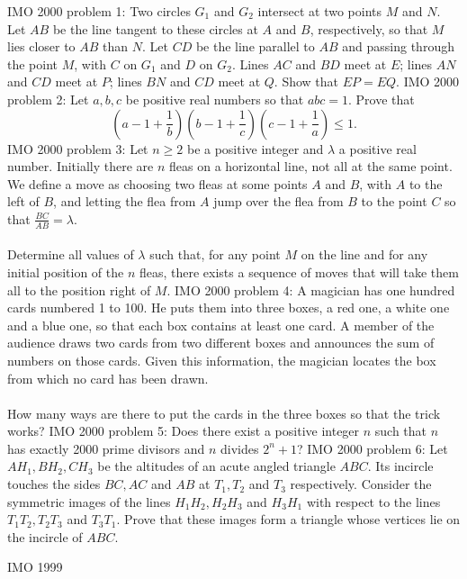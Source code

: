 IMO 2000 problem 1:  Two circles $ G_1$ and $ G_2$ intersect at two points $ M$ and $ N$. Let $ AB$ be the line tangent to these circles at $ A$ and $ B$, respectively, so that $ M$ lies closer to $ AB$ than $ N$. Let $ CD$ be the line parallel to $ AB$ and passing through the point $ M$, with $ C$ on $ G_1$ and $ D$ on $ G_2$. Lines $ AC$ and $ BD$ meet at $ E$; lines $ AN$ and $ CD$ meet at $ P$; lines $ BN$ and $ CD$ meet at $ Q$. Show that $ EP = EQ$. 
IMO 2000 problem 2:  Let $ a, b, c$ be positive real numbers so that $ abc = 1$. Prove that
\[
\left( a - 1 + \frac 1b \right) \left( b - 1 + \frac 1c \right) \left( c - 1 + \frac 1a \right) \leq 1.
\] 
IMO 2000 problem 3:  Let $ n \geq 2$ be a positive integer and $ \lambda$ a positive real number. Initially there are $ n$ fleas on a horizontal line, not all at the same point. We define a move as choosing two fleas at some points $ A$ and $ B$, with $ A$ to the left of $ B$, and letting the flea from $ A$ jump over the flea from $ B$ to the point $ C$ so that $ \frac {BC}{AB} = \lambda$. \\\\
Determine all values of $ \lambda$ such that, for any point $ M$ on the line and for any initial position of the $ n$ fleas, there exists a sequence of moves that will take them all to the position right of $ M$. 
IMO 2000 problem 4:  A magician has one hundred cards numbered 1 to 100. He puts them into three boxes, a red one, a white one and a blue one, so that each box contains at least one card. A member of the audience draws two cards from two different boxes and announces the sum of numbers on those cards. Given this information, the magician locates the box from which no card has been drawn. \\\\
How many ways are there to put the cards in the three boxes so that the trick works? 
IMO 2000 problem 5:  Does there exist a positive integer $ n$ such that $ n$ has exactly 2000 prime divisors and $ n$ divides $ 2^n + 1$? 
IMO 2000 problem 6:  Let $ AH_1, BH_2, CH_3$ be the altitudes of an acute angled triangle $ ABC$. Its incircle touches the sides $ BC, AC$ and $ AB$ at $ T_1, T_2$ and $ T_3$ respectively. Consider the symmetric images  of  the  lines $ H_1H_2, H_2H_3$ and $ H_3H_1$ with  respect  to  the  lines $ T_1T_2, T_2T_3$ and $ T_3T_1$.  Prove  that  these  images  form a  triangle  whose  vertices  lie  on  the incircle of $ ABC$. 

IMO 1999 

